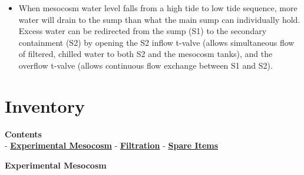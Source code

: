 \documentclass[]{book}
\providecommand{\tightlist}{%
  \setlength{\itemsep}{0pt}\setlength{\parskip}{0pt}}
\begin{document}
\begin{itemize}
  \begin{itemize}
  \tightlist
  \item
    When mesocosm water level falls from a high tide to low tide
    sequence, more water will drain to the sump than what the main sump
    can individually hold. Excess water can be redirected from the sump
    (S1) to the secondary containment (S2) by opening the S2 inflow
    t-valve (allows simultaneous flow of filtered, chilled water to both
    S2 and the mesocosm tanks), and the overflow t-valve (allows
    continuous flow exchange between S1 and S2).
  \end{itemize}
\end{itemize}

\chapter{Inventory}\label{inventory}

\textbf{Contents}\\
- \protect\hyperlink{Experimental_Mesocosm}{\textbf{Experimental
Mesocosm}} - \protect\hyperlink{Filtration}{\textbf{Filtration}} -
\protect\hyperlink{Spare_Items}{\textbf{Spare Items}}

 \textbf{Experimental Mesocosm}
\end{document}
